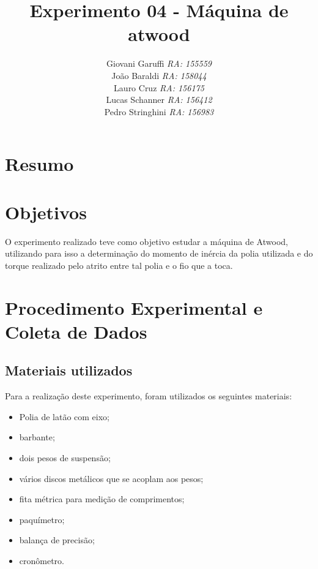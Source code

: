 \documentclass[12pt,a4paper]{article}
\begin{document}
\title{\vspace{70mm}\Huge Experimento 04 - Máquina de atwood}
\author{ Giovani Garuffi\qquad\hfill
		\textit {RA: 155559}\protect\\
		João Baraldi\hfill
		\textit{RA: 158044}\protect\\
		Lauro Cruz\hfill
		\textit{RA: 156175}\protect\\
		Lucas Schanner\hfill
		\textit{RA: 156412}\protect\\
		Pedro Stringhini\hfill
		\textit {RA: 156983}								
		}
\maketitle
\newpage
\section{Resumo}

\section{Objetivos}
O experimento realizado teve como objetivo estudar a máquina de Atwood, utilizando para isso a determinação do momento de inércia da polia utilizada e do torque realizado pelo atrito entre tal polia e o fio que a toca.


\section{Procedimento Experimental e Coleta de Dados}

\subsection{Materiais utilizados}
Para a realização deste experimento, foram utilizados os seguintes materiais:

\begin{itemize}
	\item Polia de latão com eixo;
	\item barbante;
	\item dois pesos de suspensão;
	\item vários discos metálicos que se acoplam aos pesos;
	\item fita métrica para medição de comprimentos;
	\item paquímetro;
	\item balança de precisão;
	\item cronômetro.
\end{itemize}
\end{document}
